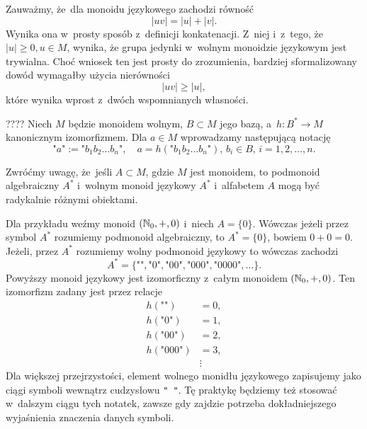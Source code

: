 \documentclass[a4paper,11pt]{article}
\begin{document}
Zauważmy, że~dla monoidu językowego zachodzi równość
\begin{equation}
  \label{eq:Forys-Forys-07}
  | u v | = | u | + | v |.
\end{equation}
Wynika ona w~prosty sposób z~definicji konkatenacji. Z~niej i~z~tego,
że~$| u | \geq 0, u \in M$, wynika, że grupa jedynki w~wolnym
monoidzie językowym jest trywialna. Choć wniosek ten jest prosty do
zrozumienia, bardziej sformalizowany dowód wymagałby użycia
nierówności
\begin{equation}
  \label{eq:Forys-Forys-08}
  | u v | \geq | u |,
\end{equation}
które wynika wprost z~dwóch wspomnianych własności.

\vspace{\spaceFour}




???? \start {} Niech $M$ będzie monoidem wolnym, $B \subset M$ jego bazą, a~$h : B^{ * } \to M$ kanonicznym izomorfizmem. Dla $a \in M$ wprowadzamy następującą notację
\begin{equation}
  \label{eq:7}
  \texttt{"} a \texttt{"} :=
  \texttt{"} b_{ 1 } b_{ 2 } \ldots b_{ n } \texttt{"}, \quad
  a = h( \texttt{"} b_{ 1 } b_{ 2 } \ldots b_{ n } \texttt{"} ), \,
  b_{ i } \in B,\, i = 1, 2, \ldots, n.
\end{equation}






 Zwróćmy uwagę, że~jeśli $A \subset M$, gdzie $M$ jest monoidem, to
podmonoid algebraiczny $A^{ * }$ i~wolnym monoid językowy $A^{ * }$
i~alfabetem $A$ mogą być radykalnie różnymi obiektami.

Dla przykładu weźmy monoid $( \mathbb{N}_{ 0 }, +, 0)$ i~niech $A = \{ 0 \}$. Wówczas
jeżeli przez symbol $A^{ * }$ rozumiemy podmonoid algebraiczny, to $A^{ * } =
\{ 0 \}$, bowiem $0 + 0 = 0$. Jeżeli, przez $A^{ * }$ rozumiemy wolny podmonoid
językowy to wówczas zachodzi
\begin{equation}
  \label{eq:Forys-Forys-09}
  A^{ * } = \{ \texttt{""}, \texttt{"} 0 \texttt{"},
  \texttt{"} 00 \texttt{"}, \texttt{"} 000 \texttt{"},
  \texttt{"} 0000 \texttt{"}, \ldots \}.
\end{equation}
Powyższy monoid językowy jest izomorficzny z~całym monoidem
$( \mathbb{N}_{ 0 }, +, 0)$. Ten izomorfizm zadany jest przez relacje
\begin{subequations}
  \begin{align}
    \label{eq:Forys-Forys-10-A}
    h( \texttt{""} ) &= 0, \\
    h( \texttt{"} 0 \texttt{"} ) &= 1, \\
    h( \texttt{"} 0 0 \texttt{"} ) &= 2, \\
    h( \texttt{"} 0 0 0 \texttt{"} ) &= 3, \\
    &\vdots
  \end{align}
\end{subequations}
Dla większej przejrzystości, element wolnego monidłu językowego zapisujemy
jako ciągi symboli wewnątrz cudzysłowu \texttt{" "}. Tę praktykę będziemy
też stosować w~dalszym ciągu tych notatek, zawsze gdy zajdzie potrzeba
dokładniejszego wyjaśnienia znaczenia danych symboli.
\end{document}
